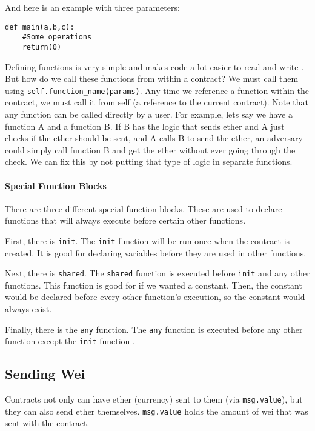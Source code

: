 \documentclass[12pt]{article}
\begin{document}
And here is an example with three parameters:

\begin{verbatim}
def main(a,b,c):
	#Some operations
	return(0)
\end{verbatim}

Defining functions is very simple and makes code a lot easier to read and write \cite{Serpent}. But how do we call these functions from within a contract? We must call them using \texttt{self.function\_name(params)}. Any time we reference a function within the contract, we must call it from self (a reference to the current contract). Note that any function can be called directly by a user. For example, lets say we have a function A and a function B. If B has the logic that sends ether and A just checks if the ether should be sent, and A calls B to send the ether, an adversary could simply call function B and get the ether without ever going through the check. We can fix this by not putting that type of logic in separate functions.

\paragraph{Special Function Blocks}
There are three different special function blocks. These are used to declare functions that will always execute before certain other functions.

First, there is \texttt{init}. The \texttt{init} function will be run once when the contract is created. It is good for declaring variables before they are used in other functions.

Next, there is \texttt{shared}. The \texttt{shared} function is executed before \texttt{init} and any other functions. This function is good for if we wanted a constant. Then, the constant would be declared before every other function's execution, so the constant would always exist.

Finally, there is the \texttt{any} function. The \texttt{any} function is executed before any other function except the \texttt{init} function \cite{Serpent}.

\subsection{Sending Wei}
Contracts not only can have ether (currency) sent to them (via \texttt{msg.value}), but they can also send ether themselves. \texttt{msg.value} holds the amount of wei that was sent with the contract.
\end{document}
